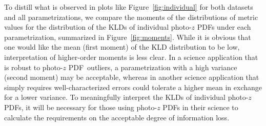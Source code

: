 \documentclass[\docopts]{\docclass}
\newcommand{\pz}{photo-$z$ PDF}
\begin{document}
To distill what is observed in plots like Figure~\ref{fig:individual} for both 
datasets and all parametrizations, we compare the moments of the distributions 
of metric values for the distribution of the KLDs of individual \pz s under 
each parametrization, summarized in Figure~\ref{fig:moments}.
While it is obvious that one would like the mean (first moment) of the KLD 
distribution to be low, interpretation of higher-order moments is less clear.
In a science application that is robust to \pz\ outliers, a parametrization 
with a high variance (second moment) may be acceptable, whereas in another 
science application that simply requires well-characterized errors could 
tolerate a higher mean in exchange for a lower variance.
To meaningfully interpret the KLDs of individual \pz s, it will be necessary 
for those using \pz s in their science to calculate the requirements on the 
acceptable degree of information loss.
\end{document}
